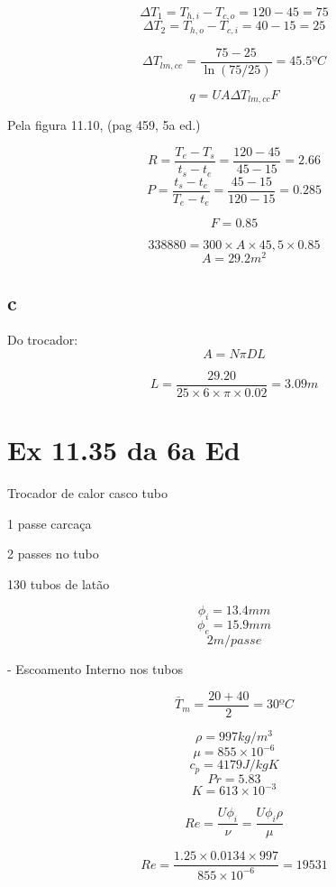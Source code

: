 \[\Delta T_{1} = T_{h,i} - T_{c,o} = 120 - 45 = 75\]
\[\Delta T_{2} = T_{h,o} - T_{c,i} = 40 - 15 = 25\]

\[\Delta T_{lm,cc} = \frac{75-25}{\ln(75/25)}=45.5ºC\]

\[q = UA \Delta T_{lm,cc} F\]

Pela figura 11.10, (pag 459, 5a ed.)


\[R = \frac{T_{e}-T_{s}}{t_{s}-t_{e}} = \frac{120-45}{45-15}=2.66\]
\[P = \frac{t_{s}-t_{e}}{T_{e}-t_{e}} = \frac{45-15}{120-15}=0.285\]

\[F = 0.85\]

\[338880=300 \times A \times 45,5 \times 0.85\]
\[A = 29.2 m^{2}\]

\subsection{c}
Do trocador:
\[A = N \pi D L \]

\[L = \frac{29.20}{25 \times 6 \times \pi \times 0.02} = 3.09 m\]

\section{Ex 11.35 da 6a Ed}



Trocador de calor casco tubo

1 passe carcaça

2 passes no tubo

130 tubos de latão

\[\phi _{i} = 13.4mm\]
\[\phi _{e} = 15.9mm\]
\[2m/passe\]

- Escoamento Interno nos tubos

\[\bar{T}_{m}=\frac{20+40}{2}=30ºC\]

\[\rho = 997 kg/m^{3}\]
\[\mu = 855 \times 10^{-6}\]
\[c_{p} = 4179 J/kgK\]
\[Pr = 5.83\]
\[K = 613 \times 10^{-3}\]

\[Re = \frac{U \phi _{i}}{\nu} = \frac{U \phi _{i} \rho}{\mu}\]

\[Re = \frac{1.25 \times 0.0134 \times 997 } { 855 \times 10 ^{-6}} = 19531\]

